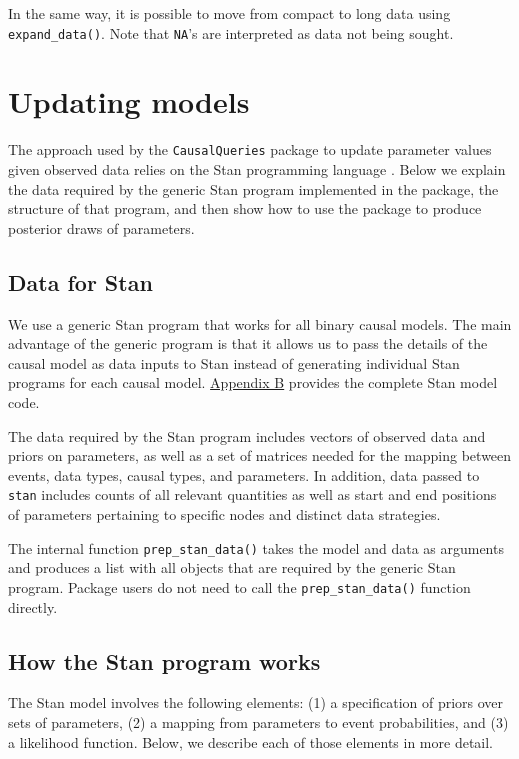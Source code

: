 \documentclass[
  11pt,
  article]{jss}
\begin{document}
In the same way, it is possible to move from compact to long data using
\texttt{expand\_data()}. Note that \texttt{NA}'s are interpreted as data
not being sought.

\section{Updating models}\label{sec-update}

The approach used by the \texttt{CausalQueries} package to update
parameter values given observed data relies on the Stan programming
language \citep{carpenter_stan_2017}. Below we explain the data required
by the generic Stan program implemented in the package, the structure of
that program, and then show how to use the package to produce posterior
draws of parameters.

\subsection{Data for Stan}\label{data-for-stan}

We use a generic Stan program that works for all binary causal models.
The main advantage of the generic program is that it allows us to pass
the details of the causal model as data inputs to Stan instead of
generating individual Stan programs for each causal model.
\hyperref[sec-stancode]{Appendix B} provides the complete Stan model
code.

The data required by the Stan program includes vectors of observed data
and priors on parameters, as well as a set of matrices needed for the
mapping between events, data types, causal types, and parameters. In
addition, data passed to \texttt{stan} includes counts of all relevant
quantities as well as start and end positions of parameters pertaining
to specific nodes and distinct data strategies.

The internal function \texttt{prep\_stan\_data()} takes the model and
data as arguments and produces a list with all objects that are required
by the generic Stan program. Package users do not need to call the
\texttt{prep\_stan\_data()} function directly.

\subsection{How the Stan program
works}\label{how-the-stan-program-works}

The Stan model involves the following elements: (1) a specification of
priors over sets of parameters, (2) a mapping from parameters to event
probabilities, and (3) a likelihood function. Below, we describe each of
those elements in more detail.
\end{document}
